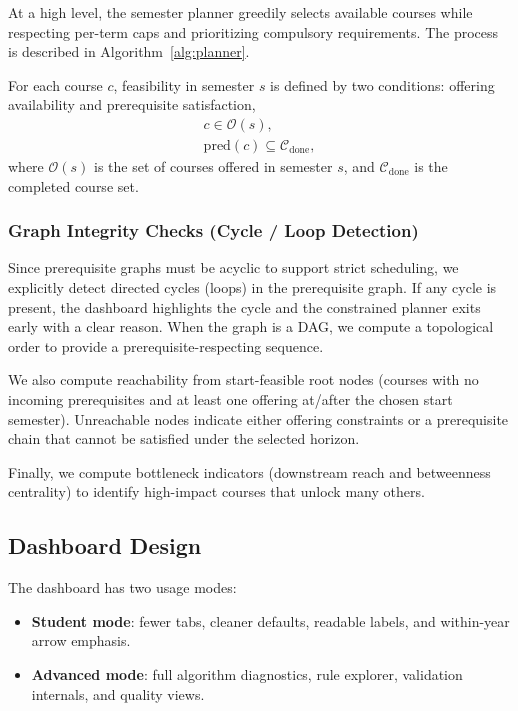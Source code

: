 At a high level, the semester planner greedily selects available courses while
respecting per-term caps and prioritizing compulsory requirements. The process
is described in Algorithm~\ref{alg:planner}.

For each course $c$, feasibility in semester $s$ is defined by two conditions:
offering availability and prerequisite satisfaction,
\begin{align}
    c \in \mathcal{O}(s), \label{eq:offering}\\
    \mathrm{pred}(c) \subseteq \mathcal{C}_{\mathrm{done}}, \label{eq:prereq}
\end{align}
where $\mathcal{O}(s)$ is the set of courses offered in semester $s$, and
$\mathcal{C}_{\mathrm{done}}$ is the completed course set.

\subsubsection{Graph Integrity Checks (Cycle / Loop Detection)}
Since prerequisite graphs must be acyclic to support strict scheduling, we
explicitly detect directed cycles (loops) in the prerequisite graph. If any
cycle is present, the dashboard highlights the cycle and the constrained
planner exits early with a clear reason. When the graph is a DAG, we compute a
topological order to provide a prerequisite-respecting sequence.

We also compute reachability from start-feasible root nodes (courses with no
incoming prerequisites and at least one offering at/after the chosen start
semester). Unreachable nodes indicate either offering constraints or a
prerequisite chain that cannot be satisfied under the selected horizon.

Finally, we compute bottleneck indicators (downstream reach and betweenness
centrality) to identify high-impact courses that unlock many others.

\subsection{Dashboard Design}
The dashboard has two usage modes:

\begin{itemize}
    \item \textbf{Student mode}: fewer tabs, cleaner defaults, readable labels,
    and within-year arrow emphasis.
    \item \textbf{Advanced mode}: full algorithm diagnostics, rule explorer,
    validation internals, and quality views.
\end{itemize}

